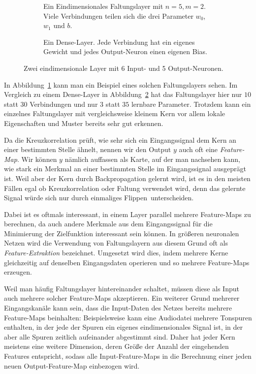 \documentclass[paper=a4, 	%
		fontsize=11pt,
		abstract=true, 	%
		headsepline, 	%
		notitlepage	%
		]{scrartcl}
\theoremstyle{definition}
\begin{document}
\begin{figure}
\begin{subfigure}{0.5\textwidth}
    \centering
    
    \caption{Ein Eindimensionales Faltungslayer mit $n=5,m=2$.
    Viele Verbindungen teilen sich die drei Parameter $w_0$, $w_1$ und $b$.
    }
    \label{fig:one-dimensional-conv-layer}
\end{subfigure}%
\begin{subfigure}{0.5\textwidth}
    \centering
    
    \caption{Ein Dense-Layer. Jede Verbindung hat ein eigenes Gewicht und jedes Output-Neuron einen eigenen Bias.}
    \label{fig:one-dimensional-dense-layer}
\end{subfigure}
    \caption{Zwei eindimensionale Layer mit 6 Input- und 5 Output-Neuronen.}
    \label{fig:one-dimensional-layers}
\end{figure}

In Abbildung~\ref{fig:one-dimensional-conv-layer} kann man ein Beispiel eines solchen Faltungslayers sehen.
Im Vergleich zu einem Dense-Layer in Abbildung~\ref{fig:one-dimensional-dense-layer} hat das Faltungslayer hier nur $10$ statt $30$ Verbindungen und nur $3$ statt $35$ lernbare Parameter.
Trotzdem kann ein einzelnes Faltungslayer mit vergleichsweise kleinem Kern vor allem lokale Eigenschaften und Muster bereits sehr gut erkennen.

Da die Kreuzkorrelation prüft, wie sehr sich ein Eingangssignal dem Kern an einer bestimmten Stelle ähnelt, nennen wir den Output $y$ auch oft eine \emph{Feature-Map}.
Wir können $y$ nämlich auffassen als Karte, auf der man nachsehen kann, wie stark ein Merkmal an einer bestimmten Stelle im Eingangssignal ausgeprägt ist.
Weil aber der Kern durch Backpropagation gelernt wird, ist es in den meisten Fällen egal ob Kreuzkorrelation oder Faltung verwendet wird, denn das gelernte Signal würde sich nur durch einmaliges \glqq Flippen\grqq\ unterscheiden.

Dabei ist es oftmals interessant, in einem Layer parallel mehrere Feature-Maps zu berechnen, da auch andere Merkmale aus dem Eingangssignal für die Minimierung der Zielfunktion interessant sein können.
In größeren neuronalen Netzen wird die Verwendung von Faltungslayern aus diesem Grund oft als \emph{Feature-Extraktion} bezeichnet.
Umgesetzt wird dies, indem mehrere Kerne gleichzeitig auf denselben Eingangsdaten operieren und so mehrere Feature-Maps erzeugen.

Weil man häufig Faltungslayer hintereinander schaltet, müssen diese als Input auch mehrere solcher Feature-Maps akzeptieren.
Ein weiterer Grund mehrerer Eingangskanäle kann sein, dass die Input-Daten des Netzes bereits mehrere Feature-Maps beinhalten:
Beispielsweise kann eine Audiodatei mehrere Tonspuren enthalten, in der jede der Spuren ein eigenes eindimensionales Signal ist, in der aber alle Spuren zeitlich aufeinander abgestimmt sind.
Daher hat jeder Kern meistens eine weitere Dimension, deren Größe der Anzahl der eingehenden Features entspricht, sodass alle Input-Feature-Maps in die Berechnung einer jeden neuen Output-Feature-Map einbezogen wird.
\end{document}
